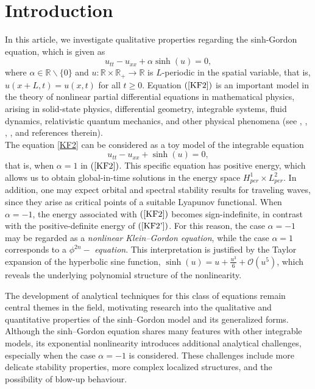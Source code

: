 \documentclass[12pt,reqno,a4paper]{amsart} %
\numberwithin{equation}{section}
\numberwithin{figure}{section}
\begin{document}
\section{Introduction} 

In this article, we investigate qualitative properties regarding the sinh-Gordon equation, which is given as 
\begin{equation}\label{KF2}
u_{tt}-u_{xx}+\alpha\sinh(u)=0,
\end{equation}
where $\alpha\in\mathbb{R}\backslash\{0\}$ and $u:\mathbb{R} \times \mathbb{R}_+ \rightarrow \mathbb{R}$ is $L$-periodic in the spatial variable, that is, $u(x+L,t)=u(x,t)$ for all $t\geq0$. Equation $(\ref{KF2})$ is an important model in the theory of nonlinear partial differential equations in mathematical physics, arising in solid-state physics, differential geometry, integrable systems, fluid dynamics, relativistic quantum mechanics, and other physical phenomena (see \cite{dodd}, \cite{drazin}, \cite{greiner}, \cite{perring-skyrme}, and references therein). \\
\indent The equation \eqref{KF2} can be considered as a toy model of the integrable equation
\begin{equation}\label{KF2'}
	u_{tt} - u_{xx} + \sinh(u) = 0,
\end{equation}
that is, when $\alpha=1$ in $(\ref{KF2})$. This specific equation has positive energy, which allows us to obtain global-in-time solutions in the energy space $H_{per}^1 \times L_{per}^2$. In addition, one may expect orbital and spectral stability results for traveling waves, since they arise as critical points of a suitable Lyapunov functional. When $\alpha=-1$, the energy associated with $(\ref{KF2})$ becomes sign-indefinite, in contrast with the positive-definite energy of $(\ref{KF2'})$. For this reason, the case $\alpha=-1$ may be regarded as a \textit{nonlinear Klein–Gordon equation}, while the case $\alpha=1$ corresponds to a $\phi^{2n}-$ \textit{equation}. This interpretation is justified by the Taylor expansion of the hyperbolic sine function, $\sinh(u) = u + \frac{u^3}{6} + \mathcal{O}(u^5)$, which reveals the underlying polynomial structure of the nonlinearity.

The development of analytical techniques for this class of equations remain central themes in the field, motivating research into the qualitative and quantitative properties of the sinh–Gordon model and its generalized forms. Although the sinh–Gordon equation shares many features with other integrable models, its exponential nonlinearity introduces additional analytical challenges, especially when the case $\alpha=-1$ is considered. These challenges include more delicate stability properties, more complex localized structures, and the possibility of blow-up behaviour.
\end{document}
